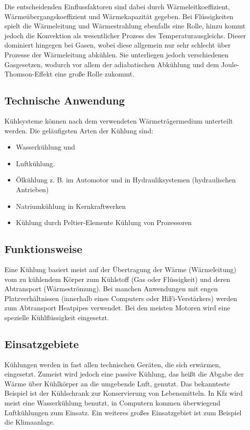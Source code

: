 Die entscheidenden Einflussfaktoren sind dabei durch Wärmeleitkoeffizient, Wärmeübergangskoeffizient und Wärmekapazität gegeben. Bei Flüssigkeiten spielt die Wärmeleitung und Wärmestrahlung ebenfalls eine Rolle, hinzu kommt jedoch die Konvektion als wesentlicher Prozess des Temperaturausgleichs. Dieser dominiert hingegen bei Gasen, wobei diese allgemein nur sehr schlecht über Prozesse der Wärmeleitung abkühlen. Sie unterliegen jedoch verschiedenen Gasgesetzen, wodurch vor allem der adiabatischen Abkühlung und dem Joule-Thomson-Effekt eine große Rolle zukommt. 

\newpage

\subsection{Technische Anwendung}

Kühlsysteme können nach dem verwendeten Wärmeträgermedium unterteilt werden. Die geläufigsten Arten der Kühlung sind:

\begin{itemize}
	\item Wasserkühlung und
	\item Luftkühlung.
	\item Ölkühlung z.  B. im Automotor und in Hydrauliksystemen (hydraulischen Antrieben) 
	\item Natriumkühlung in Kernkraftwerken
	\item Kühlung durch Peltier-Elemente Kühlung von Prozessoren
\end{itemize}

\subsection{Funktionsweise}

Eine Kühlung basiert meist auf der Übertragung der Wärme (Wärmeleitung) vom zu kühlendem Körper zum Kühlstoff (Gas oder Flüssigkeit) und deren Abtransport (Wärmeströmung).
Bei manchen Anwendungen mit engen Platzverhältnissen (innerhalb eines Computers oder HiFi-Verstärkers) werden zum Abtransport Heatpipes verwendet.
Bei den meisten Motoren wird eine spezielle Kühlflüssigkeit eingesetzt.

\subsection{Einsatzgebiete}

Kühlungen werden in fast allen technischen Geräten, die sich erwärmen, eingesetzt. Zumeist wird jedoch eine passive Kühlung, das heißt die Abgabe der Wärme über Kühlkörper an die umgebende Luft, genutzt.
Das bekannteste Beispiel ist der Kühlschrank zur Konservierung von Lebensmitteln. In Kfz wird meist eine Wasserkühlung benutzt, in Computern kommen überwiegend Luftkühlungen zum Einsatz. Ein weiteres großes Einsatzgebiet ist zum Beispiel die Klimaanlage.

